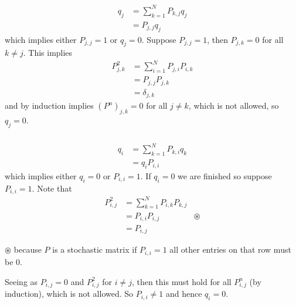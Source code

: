 \documentclass{unswmaths}
\begin{document}
\subsection{}
\subsubsection{}
    \begin{align*}
        q_j &= \sum_{k=1}^{N} P_{k,j}q_j \\
            &= P_{j,j} q_j
    \end{align*}
    which implies either $ P_{j,j} = 1 $ or $ q_j = 0 $. Suppose $ P_{j,j} = 1 $, then $ P_{j,k} = 0 $ for all $ k \neq j $. This implies
    \begin{align*}
        P_{j,k}^2 &= \sum_{i = 1}^N P_{j,i}P_{i,k} \\
            &= P_{j,j}P_{j,k} \\
            &= \delta_{j,k}
    \end{align*}
    and by induction implies 
     $ (P^n)_{j,k} = 0 $ for all $ j \neq k $, which is not allowed, so $ q_j = 0 $.
\subsubsection{}
    \begin{align*}
        q_i &= \sum_{k = 1}^N P_{k,i}q_k \\
            &= q_iP_{i,i}
    \end{align*}
    which implies either $ q_i = 0 $ or $ P_{i,i} = 1 $. If $ q_i =0 $ we are finished so suppose
    $ P_{i,i} = 1 $. 
    Note that
    \begin{align*}
        P_{i,j}^2 &= \sum_{k = 1}^N P_{i,k}P_{k,j} \\
            &= P_{i,i}P_{i,j} & \circledast \\
            &= P_{i,j}
    \end{align*}
    
    $ \circledast $ because $ P $ is a stochastic matrix if $ P_{i,i} = 1 $ all other entries on that row must be  $ 0 $.
    
    Seeing as $ P_{i,j} = 0 $ and $ P_{i,j}^2 $ for $ i \neq j $, then this must hold for all $ P^n_{i,j} $ (by induction), which is not
    allowed. So $ P_{i,i} \neq 1 $ and hence $ q_i = 0 $.
\end{document}
